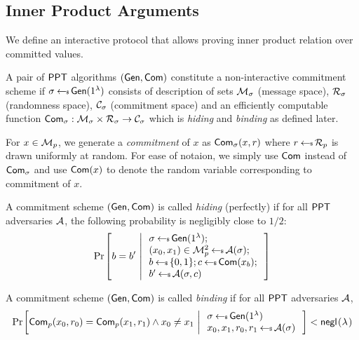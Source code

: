 \subsection{Inner Product Arguments}
We define an interactive protocol that allows proving inner product relation
over committed values. 
\begin{definition}\label{defn:commscheme}
 A pair of $\mathsf{PPT}$ algorithms
$(\mathsf{Gen},\mathsf{Com})$ constitute a non-interactive commitment scheme if
$\sigma\hskip2.3pt{\gets\!\!\mbox{\tiny${\$}$\normalsize}}\, \mathsf{Gen}(1^{\lambda})$ consists of description of sets
$\mathcal{M}_\sigma$ (message space), $\mathcal{R}_\sigma$ (randomness space),
$\mathcal{C}_\sigma$ (commitment space) and an efficiently computable function 
$\mathsf{Com}_\sigma: \mathcal{M}_\sigma\times \mathcal{R}_\sigma\rightarrow \mathcal{C}_\sigma$ which is {\em hiding} and {\em binding} as defined later.
\end{definition}

For $x\in \mathcal{M}_p$, we generate a {\em commitment} of $x$
as $\mathsf{Com}_\sigma(x,r)$ where $r\hskip2.3pt{\gets\!\!\mbox{\tiny${\$}$\normalsize}}\, \mathcal{R}_p$ is drawn uniformly at random. For ease
of notaion, we simply use $\mathsf{Com}$ instead of $\mathsf{Com}_\sigma$ and use $\mathsf{Com}(x)$ to denote the random variable corresponding to commitment of $x$. 

\begin{definition}\label{defn:hidingcomm}
A commitment scheme $(\mathsf{Gen},\mathsf{Com})$ is called {\em hiding} (perfectly) if for
all $\mathsf{PPT}$ adversaries $\mathcal{A}$, the following probability is negligibly close to
$1/2$:
\begin{align*}
\condprob{b=b'}{
\begin{array}{l}
\sigma\sample \csetup(\secparam); \\
(x_0,x_1)\in \mc{M}^2_p\sample \adv(\sigma); \\
b\sample \{0,1\}; c\sample \comm(x_b);\\
b'\sample \adv(\sigma,c)
\end{array}
}
\end{align*}
\end{definition}

\begin{definition}\label{defn:bindingcomm}
A commitment scheme $(\mathsf{Gen},\mathsf{Com})$ is called {\em binding} if for all $\mathsf{PPT}$
adversaries $\mathcal{A}$, 
\begin{align*}
\condprob{\comm_p(x_0,r_0)=\comm_p(x_1,r_1)\wedge x_0\neq x_1}{
\begin{array}{l}
\sigma\sample \csetup(\secparam) \\
x_0,x_1,r_0,r_1 \sample \adv(\sigma)
\end{array}
} < \negl
\end{align*}

\end{definition}

